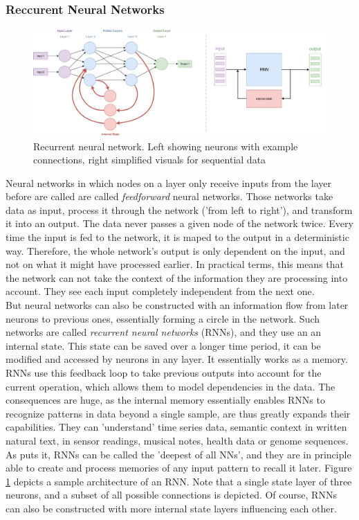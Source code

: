 \documentclass[
	a4paper,
	pagesize,
	pdftex,
	12pt,
	twoside, %
	BCOR=5mm, %
	ngerman,
	fleqn,
	final,
	]{scrartcl}
\begin{document}
\subsubsection{Reccurent Neural Networks}\label{RNN}
\begin{figure}[ht]
	\centering
	\includegraphics[width=\linewidth]{img/RecurrentNeuralNetwork}
	\caption{Recurrent neural network. Left showing neurons with example connections, right simplified visuals for sequential data}
	\label{fig:rnn}
\end{figure}
Neural networks in which nodes on a layer only receive inputs from the layer before are called are called \textit{feedforward} neural networks. Those networks take data as input, process it through the network ('from left to right'), and transform it into an output. The data never passes a given node of the network twice. Every time the input is fed to the network, it is maped to the output in a deterministic way. Therefore, the whole network's output is only dependent on the input, and not on what it might have processed earlier. In practical terms, this means that the network can not take the context of the information they are processing into account. They see each input completely independent from the next one.\\
But neural networks can also be constructed with an information flow from later neurons to previous ones, essentially forming a circle in the network. Such networks are called \textit{recurrent neural networks} (RNNs), and they use an an internal state. This state can be saved over a longer time period, it can be modified and accessed by neurons in any layer. It essentially works as a memory. RNNs use this feedback loop to take previous outputs into account for the current operation, which allows them to model dependencies in the data. The consequences are huge, as the internal memory essentially enables RNNs to recognize patterns in data beyond a single sample, are thus greatly expands their capabilities. They can 'understand' time series data, semantic context in written natural text, in sensor readings, musical notes, health data or genome sequences. As \cite{Schmidhuber.2015} puts it, RNNs can be called the 'deepest of all NNs', and they are in principle able to create and process memories of any input pattern to recall it later. Figure \ref{fig:rnn} depicts a sample architecture of an RNN. Note that a single state layer of three neurons, and a subset of all possible connections is depicted. Of course, RNNs can also be constructed with more internal state layers influencing each other.\\
\end{document}
